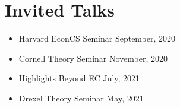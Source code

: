 \documentclass{article}
\begin{document}
    \section{Invited Talks}
    \begin{itemize}
    	\item Harvard EconCS Seminar \hfill September, 2020
    	\item Cornell Theory Seminar \hfill November, 2020
    	\item Highlights Beyond EC \hfill July, 2021
    \end{itemize}
    
    \begin{itemize}
    	\item Drexel Theory Seminar \hfill May, 2021
    \end{itemize}
    
    
\end{document}
